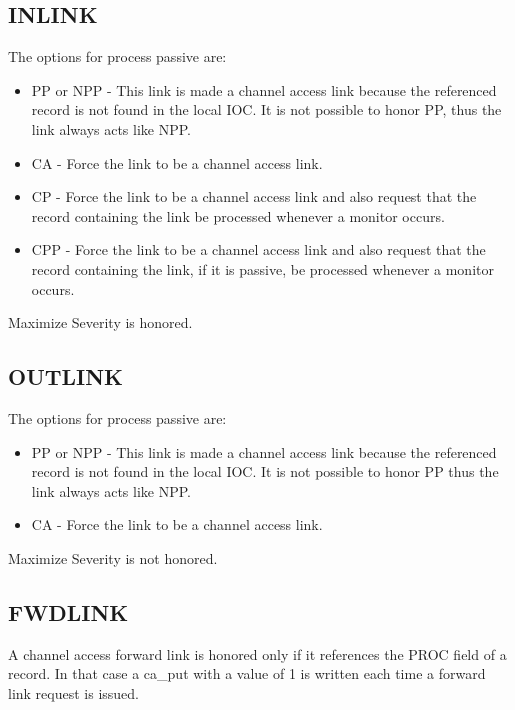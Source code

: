 \subsection{INLINK}

The options for process passive are:

\begin{itemize}
\item PP or NPP - This link is made a channel access link because the referenced record is not found in the local IOC. It 
is not possible to honor PP, thus the link always acts like NPP.

\item CA - Force the link to be a channel access link.

\item CP - Force the link to be a channel access link and also request that the record containing the link be processed 
whenever a monitor occurs.

\item CPP - Force the link to be a channel access link and also request that the record containing the link, if it is passive, 
be processed whenever a monitor occurs.

\end{itemize}

Maximize Severity is honored.

\subsection{OUTLINK}

The options for process passive are:

\begin{itemize}
\item PP or NPP - This link is made a channel access link because the referenced record is not found in the local IOC. It 
is not possible to honor PP thus the link always acts like NPP.

\item CA - Force the link to be a channel access link.

\end{itemize}

Maximize Severity is not honored.

\subsection{FWDLINK}

A channel access forward link is honored only if it references the PROC field of a record. In that case a ca\_put with a 
value of 1 is written each time a forward link request is issued.

